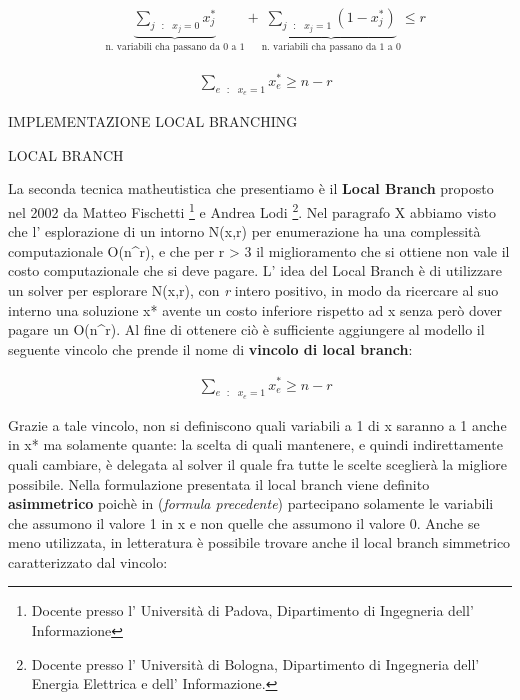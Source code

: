 \documentclass[11pt]{article}
\begin{document}
\begin{eqnarray}
&\displaystyle\underbrace{\sum_{j\text{ } : \text{ } x_j = 0} x_j^{*}}_{\text{n. variabili cha passano da 0 a 1}} + \underbrace{\sum_{j\text{ }:\text{ } x_j = 1}(1 - x_j^{*})}_{\text{n. variabili cha passano da 1 a 0}} \le r
\end{eqnarray}

\begin{eqnarray}
&\displaystyle\sum_{e \text{ } : \text{ } x_e = 1} x_e^{*} \ge n - r
\end{eqnarray}

\vspace{2\baselineskip}
IMPLEMENTAZIONE LOCAL BRANCHING
\vspace{2\baselineskip}

\vspace{2\baselineskip}
LOCAL BRANCH
\vspace{2\baselineskip} 

La seconda tecnica matheutistica che presentiamo è il \textbf{Local Branch }proposto nel 2002 da Matteo Fischetti \footnote{Docente presso l' Università di Padova, Dipartimento di Ingegneria dell’ Informazione} e Andrea Lodi \footnote{Docente presso l' Università di Bologna, Dipartimento di Ingegneria dell' Energia Elettrica e dell' Informazione.}. Nel paragrafo X abbiamo visto che l' esplorazione di un intorno N(x,r) per enumerazione ha una complessità computazionale O(n^r), e che per r > 3 il miglioramento che si ottiene non vale il costo computazionale che si deve pagare. L' idea del Local Branch è di utilizzare un solver per esplorare N(x,r), con \textit{r} intero positivo, in modo da ricercare al suo interno una soluzione x* avente un costo inferiore rispetto ad x senza però dover pagare un O(n^r). Al fine di ottenere ciò è sufficiente aggiungere al modello il seguente vincolo che prende il nome di \textbf{vincolo di local branch}:

\begin{eqnarray}
&\displaystyle\sum_{e \text{ } : \text{ } x_e = 1} x_e^{*} \ge n - r
\end{eqnarray}

Grazie a tale vincolo, non si definiscono quali variabili a 1 di x saranno a 1 anche in x* ma solamente quante: la scelta di quali mantenere, e quindi indirettamente quali cambiare, è delegata al solver il quale fra tutte le scelte sceglierà la migliore possibile. Nella formulazione presentata il local branch viene definito \textbf{asimmetrico} poichè in (\textit{formula precedente}) partecipano solamente le variabili che assumono il valore 1 in x e non quelle che assumono il valore 0.  Anche se meno utilizzata, in letteratura è possibile trovare anche il local branch simmetrico caratterizzato dal vincolo: 
\end{document}
